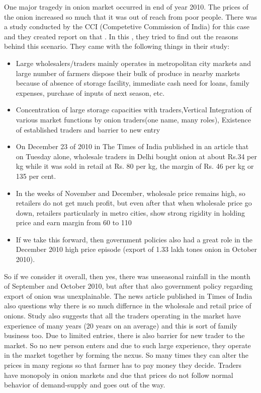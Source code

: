 One major tragedy in onion market occurred in end of year 2010. The prices of the onion increased so much that it was out of reach from poor people. There was a study conducted by the CCI (Competetive Commission of India) for this case and they created report on that \cite{CCI}. In this \cite{CCI}, they tried to find out the reasons behind this scenario. They came with the following things in their study:

\begin{itemize}

\item Large wholesalers/traders mainly operates in metropolitan city markets and large number of farmers dispose their bulk of produce in nearby markets because of absence of storage facility, immediate cash need for loans, family expenses, purchase of inputs of next season, etc.

\item Concentration of large storage capacities with traders,Vertical Integration of various market functions by onion traders(one
name, many roles), Existence of established traders and barrier to new entry

\item On December 23 of 2010 in The Times of India published in an article that on Tuesday alone, wholesale traders in Delhi bought onion at about Rs.34 per kg while it was sold in retail at Rs. 80 per kg, the margin of Rs. 46 per kg or 135 per cent.

\item In the weeks of November and December, wholesale price remains high, so retailers do not get much profit, but even after that when wholesale price go down, retailers particularly in metro cities, show strong rigidity in holding price and earn margin from 60 to 110%

\item If we take this forward, then government policies also had a great role in the December 2010 high price episode (export of 1.33 lakh tones onion in October 2010).

\end{itemize}

So if we consider it overall, then yes, there was unseasonal rainfall in the month of September and October 2010, but after that also government policy regarding export of onion was unexplainable. The news article published in Times of India also questions why there is so much differnce in the wholesale and retail price of onions. Study also suggests that all the traders operating in the market have experience of many years (20 years on an average) and this is sort of family business too. Due to limited entries, there is also barrier for new trader to the market. So no new person enters and due to such large experience, they operate in the market together by forming the nexus. So many times they can alter the prices in many regions so that farmer has to pay money they decide. Traders have monopoly in onion markets and due that prices do not follow normal behavior of demand-supply and goes out of the way.




